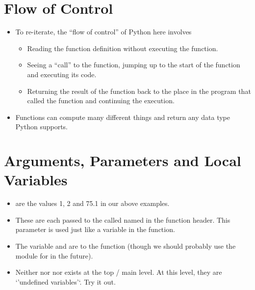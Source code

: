 \documentclass[letterpaper,10pt,english]{sphinxmanual}
\begin{document}
\section{Flow of Control}
\label{\detokenize{lecture_notes/lec05_functions2:flow-of-control}}\begin{itemize}
\item {} 
To re-iterate, the “flow of control” of Python here involves
\begin{itemize}
\item {} 
Reading the function definition without executing the function.

\item {} 
Seeing a “call” to the function, jumping up to the start of the
function and executing its code.

\item {} 
Returning the result of the function back to the place in the
program that called the function and continuing the execution.

\end{itemize}

\item {} 
Functions can compute many different things and return any data type
Python supports.

\end{itemize}


\section{Arguments, Parameters and Local Variables}
\label{\detokenize{lecture_notes/lec05_functions2:arguments-parameters-and-local-variables}}\begin{itemize}
\item {} 
 are the values 1, 2 and 75.1 in our above examples.

\item {} 
These are each passed to the  called  named in
the function header. This parameter is used just like a variable in
the function.

\item {} 
The variable  and  are  to the
function (though we should probably use the  module for 
in the future).

\item {} 
Neither  nor  nor  exists at the top / main
level. At this level, they are ‘’undefined variables’‘. Try it out.

\end{itemize}
\end{document}
